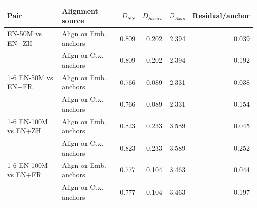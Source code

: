 \begin{tabular}{@{}llrrrr@{}}
\toprule
Pair & Alignment source & $D_{NN}$ & $D_{Struct}$ & $D_{Axis}$ & Residual/anchor \\
\midrule
EN-50M vs EN+ZH & Align on Emb. anchors & 0.809 & 0.202 & 2.394 & 0.039 \\
 & Align on Ctx. anchors & 0.809 & 0.202 & 2.394 & 0.192 \\
\cmidrule(lr){1-6}
EN-50M vs EN+FR & Align on Emb. anchors & 0.766 & 0.089 & 2.331 & 0.038 \\
 & Align on Ctx. anchors & 0.766 & 0.089 & 2.331 & 0.154 \\
\cmidrule(lr){1-6}
EN-100M vs EN+ZH & Align on Emb. anchors & 0.823 & 0.233 & 3.589 & 0.045 \\
 & Align on Ctx. anchors & 0.823 & 0.233 & 3.589 & 0.252 \\
\cmidrule(lr){1-6}
EN-100M vs EN+FR & Align on Emb. anchors & 0.777 & 0.104 & 3.463 & 0.044 \\
 & Align on Ctx. anchors & 0.777 & 0.104 & 3.463 & 0.197 \\
\bottomrule
\end{tabular}

